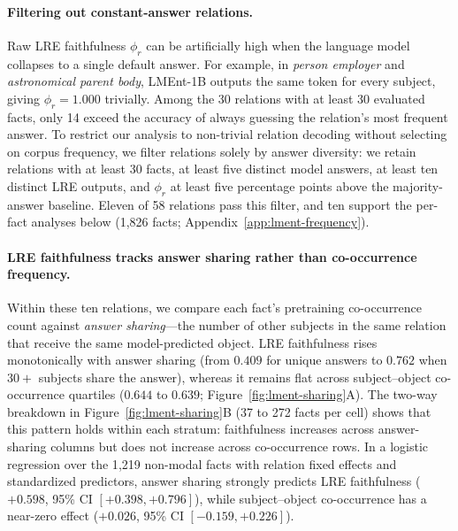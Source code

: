 \paragraph{Filtering out constant-answer relations.}
Raw LRE faithfulness $\phi_r$ can be artificially high when the language model
collapses to a single default answer. For example, in \emph{person employer} and
\emph{astronomical parent body}, LMEnt-1B outputs the same token for every
subject, giving $\phi_r=1.000$ trivially. Among the 30 relations with at least
30 evaluated facts, only 14 exceed the accuracy of always guessing the
relation's most frequent answer. To restrict our analysis to non-trivial
relation decoding without selecting on corpus frequency, we filter relations
solely by answer diversity: we retain relations with at least 30 facts, at least
five distinct model answers, at least ten distinct LRE outputs, and $\phi_r$ at
least five percentage points above the majority-answer baseline. Eleven of 58
relations pass this filter, and ten support the per-fact analyses below (1,826
facts; Appendix~\ref{app:lment-frequency}).

\paragraph{LRE faithfulness tracks answer sharing rather than co-occurrence frequency.}
Within these ten relations, we compare each fact's pretraining co-occurrence
count against \emph{answer sharing}---the number of other subjects in the same
relation that receive the same model-predicted object. LRE faithfulness rises
monotonically with answer sharing (from $0.409$ for unique answers to $0.762$
when $30+$ subjects share the answer), whereas it remains flat across
subject--object co-occurrence quartiles ($0.644$ to $0.639$;
Figure~\ref{fig:lment-sharing}A). The two-way breakdown in
Figure~\ref{fig:lment-sharing}B (37 to 272 facts per cell) shows that this
pattern holds within each stratum: faithfulness increases across answer-sharing
columns but does not increase across co-occurrence rows. In a logistic
regression over the 1{,}219 non-modal facts with relation fixed effects and
standardized predictors, answer sharing strongly predicts LRE faithfulness
($+0.598$, 95\% CI $[+0.398,+0.796]$), while subject--object co-occurrence has a
near-zero effect ($+0.026$, 95\% CI $[-0.159,+0.226]$).


